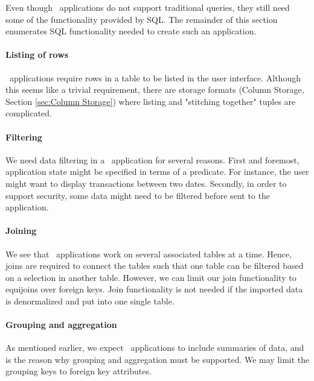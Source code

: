 Even though \bd~applications do not support traditional queries, they still need some of the functionality provided by SQL. The remainder of this section enumerates SQL functionality needed to create such an application.

\paragraph{Listing of rows}
\bd~applications require rows in a table to be listed in the user interface. Although this seems like a trivial requirement, there are storage formats (Column Storage, Section \ref{sec:Column Storage}) where listing and "stitching together" tuples are complicated. 

\paragraph{Filtering}
We need data filtering in a \bd~application for several reasons. First and foremost, application state might be specified in terms of a predicate. For instance, the user might want to display transactions between two dates. Secondly, in order to support security, some data might need to be filtered before sent to the application.

\paragraph{Joining}
We see that \bd~applications work on several associated tables at a time. Hence, joins are required to connect the tables such that one table can be filtered based on a selection in another table. However, we can limit our join functionality to equijoins over foreign keys. Join functionality is not needed if the imported data is denormalized and put into one single table.

\paragraph{Grouping and aggregation}
\label{par:Grouping and aggregation}
As mentioned earlier, we expect \bd~applications to include summaries of data, and is the reason why grouping and aggregation must be supported. We may limit the grouping keys to foreign key attributes.

